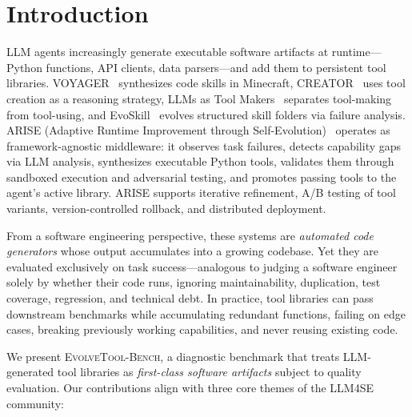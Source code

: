 \documentclass[]{ceurart}
\begin{document}
\maketitle

\section{Introduction}

LLM agents increasingly generate executable software artifacts at runtime---Python functions, API clients, data parsers---and add them to persistent tool libraries. VOYAGER~\cite{wang2023voyager} synthesizes code skills in Minecraft, CREATOR~\cite{qian2023creator} uses tool creation as a reasoning strategy, LLMs as Tool Makers~\cite{cai2023latm} separates tool-making from tool-using, and EvoSkill~\cite{alzubi2026evoskill} evolves structured skill folders via failure analysis. ARISE (Adaptive Runtime Improvement through Self-Evolution)~\cite{kaliyev2026arise} operates as framework-agnostic middleware: it observes task failures, detects capability gaps via LLM analysis, synthesizes executable Python tools, validates them through sandboxed execution and adversarial testing, and promotes passing tools to the agent's active library. ARISE supports iterative refinement, A/B testing of tool variants, version-controlled rollback, and distributed deployment.

From a software engineering perspective, these systems are \emph{automated code generators} whose output accumulates into a growing codebase. Yet they are evaluated exclusively on task success---analogous to judging a software engineer solely by whether their code runs, ignoring maintainability, duplication, test coverage, regression, and technical debt. In practice, tool libraries can pass downstream benchmarks while accumulating redundant functions, failing on edge cases, breaking previously working capabilities, and never reusing existing code.

We present \textsc{EvolveTool-Bench}, a diagnostic benchmark that treats LLM-generated tool libraries as \emph{first-class software artifacts} subject to quality evaluation. Our contributions align with three core themes of the LLM4SE community:
\end{document}
